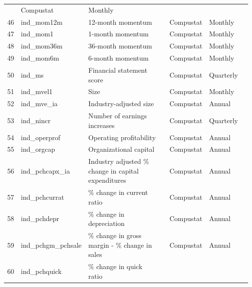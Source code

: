 \documentclass[11pt, a4paper, table]{article}
\begin{document}
\begin{landscape}
\begin{center}
\begin{longtable}{lllllll}
				\cite{bali_maxing_2011} & Compustat & Monthly \\
			46 & ind\_mom12m & 12-month momentum & 
				\cite{jegadeesh_evidence_1990} & Compustat & Monthly \\
			47 & ind\_mom1 & 1-month momentum & 
				\cite{jegadeesh_returns_1993} & Compustat & Monthly \\
			48 & ind\_mom36m\footnotemark[\value{footnote}] & 36-month momentum & 
				\cite{jegadeesh_returns_1993} & Compustat & Monthly \\
			49 & ind\_mom6m & 6-month momentum & 
				\cite{jegadeesh_returns_1993} & Compustat & Monthly \\
			50 & ind\_ms & Financial statement score & 
				\cite{mohanram_separating_2005} & Compustat & Quarterly \\
			51 & ind\_mvel1 & Size & 
				\cite{banz_relationship_1981} & Compustat & Monthly \\
			52 & ind\_mve\_ia & Industry-adjusted size & 
				\cite{asness_predicting_2000} & Compustat & Annual \\
			53 & ind\_nincr & Number of earnings increases & 
				\cite{barth_market_1999} & Compustat & Quarterly \\
			54 & ind\_operprof\footnotemark[\value{footnote}] & Operating profitability & 
				\cite{fama_five-factor_2015} & Compustat & Annual \\
			55 & ind\_orgcap\footnotemark[\value{footnote}] & Organizational capital & 
				\cite{eisfeldt_organization_2013} & Compustat & Annual \\
			56 & ind\_pchcapx\_ia\footnotemark[\value{footnote}] & Industry adjusted \% change in capital expenditures & 
				\cite{abarbanell_abnormal_1998} & Compustat & Annual \\
			57 & ind\_pchcurrat\footnotemark[\value{footnote}] & \% change in current ratio & 
				\cite{ou_financial_1989} & Compustat & Annual \\
			58 & ind\_pchdepr\footnotemark[\value{footnote}] & \% change in depreciation & 
				\cite{holthausen_prediction_1992} & Compustat & Annual \\
			59 & ind\_pchgm\_pchsale\footnotemark[\value{footnote}] & \% change in gross margin - \% change in sales & 
				\cite{abarbanell_abnormal_1998} & Compustat & Annual \\
			60 & ind\_pchquick\footnotemark[\value{footnote}] & \% change in quick ratio & 

\end{longtable}
\end{center}
\end{landscape}
\end{document}
